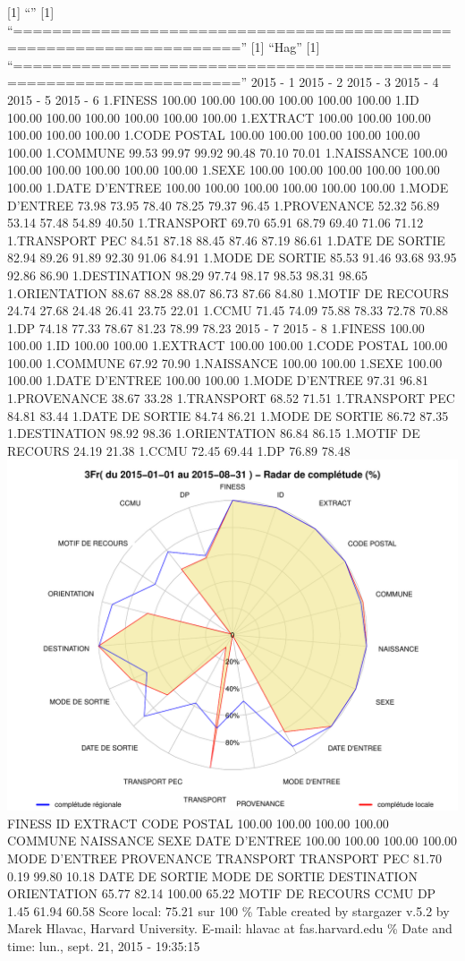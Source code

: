 \documentclass[]{article}
\begin{document}
{[}1{]} ``'' {[}1{]}
``=====================================================================''
{[}1{]} ``Hag'' {[}1{]}
``=====================================================================''
2015 - 1 2015 - 2 2015 - 3 2015 - 4 2015 - 5 2015 - 6 1.FINESS 100.00
100.00 100.00 100.00 100.00 100.00 1.ID 100.00 100.00 100.00 100.00
100.00 100.00 1.EXTRACT 100.00 100.00 100.00 100.00 100.00 100.00 1.CODE
POSTAL 100.00 100.00 100.00 100.00 100.00 100.00 1.COMMUNE 99.53 99.97
99.92 90.48 70.10 70.01 1.NAISSANCE 100.00 100.00 100.00 100.00 100.00
100.00 1.SEXE 100.00 100.00 100.00 100.00 100.00 100.00 1.DATE D'ENTREE
100.00 100.00 100.00 100.00 100.00 100.00 1.MODE D'ENTREE 73.98 73.95
78.40 78.25 79.37 96.45 1.PROVENANCE 52.32 56.89 53.14 57.48 54.89 40.50
1.TRANSPORT 69.70 65.91 68.79 69.40 71.06 71.12 1.TRANSPORT PEC 84.51
87.18 88.45 87.46 87.19 86.61 1.DATE DE SORTIE 82.94 89.26 91.89 92.30
91.06 84.91 1.MODE DE SORTIE 85.53 91.46 93.68 93.95 92.86 86.90
1.DESTINATION 98.29 97.74 98.17 98.53 98.31 98.65 1.ORIENTATION 88.67
88.28 88.07 86.73 87.66 84.80 1.MOTIF DE RECOURS 24.74 27.68 24.48 26.41
23.75 22.01 1.CCMU 71.45 74.09 75.88 78.33 72.78 70.88 1.DP 74.18 77.33
78.67 81.23 78.99 78.23 2015 - 7 2015 - 8 1.FINESS 100.00 100.00 1.ID
100.00 100.00 1.EXTRACT 100.00 100.00 1.CODE POSTAL 100.00 100.00
1.COMMUNE 67.92 70.90 1.NAISSANCE 100.00 100.00 1.SEXE 100.00 100.00
1.DATE D'ENTREE 100.00 100.00 1.MODE D'ENTREE 97.31 96.81 1.PROVENANCE
38.67 33.28 1.TRANSPORT 68.52 71.51 1.TRANSPORT PEC 84.81 83.44 1.DATE
DE SORTIE 84.74 86.21 1.MODE DE SORTIE 86.72 87.35 1.DESTINATION 98.92
98.36 1.ORIENTATION 86.84 86.15 1.MOTIF DE RECOURS 24.19 21.38 1.CCMU
72.45 69.44 1.DP 76.89 78.48
\includegraphics{completude_files/figure-latex/finess-7.pdf} FINESS ID
EXTRACT CODE POSTAL 100.00 100.00 100.00 100.00 COMMUNE NAISSANCE SEXE
DATE D'ENTREE 100.00 100.00 100.00 100.00 MODE D'ENTREE PROVENANCE
TRANSPORT TRANSPORT PEC 81.70 0.19 99.80 10.18 DATE DE SORTIE MODE DE
SORTIE DESTINATION ORIENTATION 65.77 82.14 100.00 65.22 MOTIF DE RECOURS
CCMU DP 1.45 61.94 60.58 Score local: 75.21 sur 100 \% Table created by
stargazer v.5.2 by Marek Hlavac, Harvard University. E-mail: hlavac at
fas.harvard.edu \% Date and time: lun., sept. 21, 2015 - 19:35:15
\end{document}
